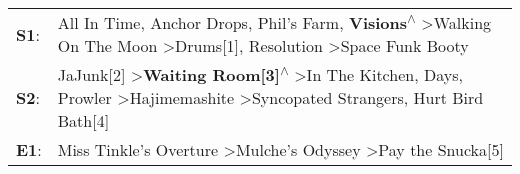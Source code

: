 \begin{supertabular}{p{0.03\textwidth}p{0.92\textwidth}}
 \textbf{S1}:  &                      All In Time\textsuperscript{}, \enspace Anchor Drops\textsuperscript{}, \enspace Phil's Farm\textsuperscript{}, \enspace \textbf{Visions\textsuperscript{$\wedge$}} \textgreater \enspace Walking On The Moon\textsuperscript{} \textgreater \enspace Drums[1]\textsuperscript{}, \enspace Resolution\textsuperscript{} \textgreater \enspace Space Funk Booty\textsuperscript{}  \enspace  \\
 \textbf{S2}:  &  JaJunk[2]\textsuperscript{} \textgreater \enspace \textbf{Waiting Room[3]\textsuperscript{$\wedge$}} \textgreater \enspace In The Kitchen\textsuperscript{},  Days\textsuperscript{}, \enspace Prowler\textsuperscript{} \textgreater \enspace Hajimemashite\textsuperscript{} \textgreater \enspace Syncopated Strangers\textsuperscript{}, \enspace Hurt Bird Bath[4]\textsuperscript{}  \enspace  \\
 \textbf{E1}:  &                                                                                                                                                                                                                                           Miss Tinkle's Overture\textsuperscript{} \textgreater \enspace Mulche's Odyssey\textsuperscript{} \textgreater \enspace Pay the Snucka[5]\textsuperscript{}  \enspace  \\
\end{supertabular}

